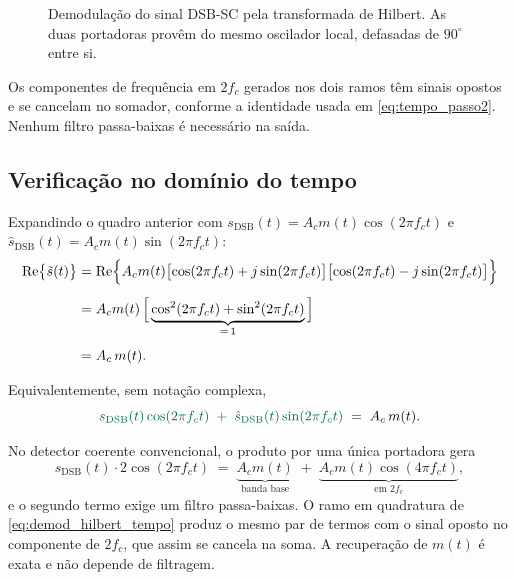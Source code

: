 \documentclass[11pt,a4paper]{article}
\newcommand{\DSB}{\text{DSB}}
\begin{document}
\begin{figure}[H]
\caption{Demodulação do sinal DSB-SC pela transformada de Hilbert. As duas portadoras provêm do mesmo oscilador local, defasadas de $90^{\circ}$ entre si.}
\label{fig:demod_hilbert}
\end{figure}

Os componentes de frequência em $2f_c$ gerados nos dois ramos têm sinais opostos e se cancelam no somador, conforme a identidade usada em \eqref{eq:tempo_passo2}. Nenhum filtro passa-baixas é necessário na saída.

\subsection{Verificação no domínio do tempo}

Expandindo o quadro anterior com $s_{\DSB}(t) = A_c m(t)\cos(2\pi f_c t)$ e $\hat{s}_{\DSB}(t) = A_c m(t)\sin(2\pi f_c t)$:
\begin{align}
  \operatorname{Re}\bigl\{\tilde{s}(t)\bigr\}
  &= \operatorname{Re}\Bigl\{ A_c m(t)\bigl[\cos(2\pi f_c t) + j\sin(2\pi f_c t)\bigr]
     \bigl[\cos(2\pi f_c t) - j\sin(2\pi f_c t)\bigr]\Bigr\}
  \label{eq:tempo_passo1}\\[0.5em]
  &= A_c m(t)\,\Bigl[\,\underbrace{\cos^{2}(2\pi f_c t) + \sin^{2}(2\pi f_c t)}_{=\,1}\,\Bigr]
  \label{eq:tempo_passo2}\\[0.5em]
  &= A_c\, m(t).
  \label{eq:tempo_passo3}
\end{align}

Equivalentemente, sem notação complexa,
\begin{equation}
  \textcolor{verde}{s_{\DSB}(t)\cos(2\pi f_c t) \;+\; \hat{s}_{\DSB}(t)\sin(2\pi f_c t)} \;=\; A_c\, m(t).
  \label{eq:demod_hilbert_tempo}
\end{equation}

\begin{observacao}
No detector coerente convencional, o produto por uma única portadora gera
\[
  s_{\DSB}(t)\cdot 2\cos(2\pi f_c t)
  \;=\; \underbrace{A_c m(t)}_{\text{banda base}}
   \;+\; \underbrace{A_c m(t)\cos(4\pi f_c t)}_{\text{em } 2f_c},
\]
e o segundo termo exige um filtro passa-baixas. O ramo em quadratura de \eqref{eq:demod_hilbert_tempo} produz o mesmo par de termos com o sinal oposto no componente de $2f_c$, que assim se cancela na soma. A recuperação de $m(t)$ é exata e não depende de filtragem.
\end{observacao}
\end{document}
